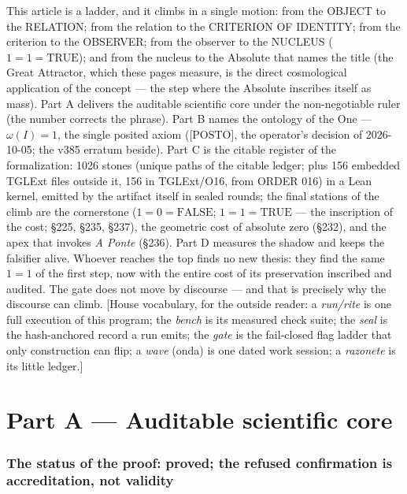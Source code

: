 \documentclass[11pt]{article}
\theoremstyle{definition}\newtheorem{deriv}{Derivation}
\begin{document}
\noindent This article is a ladder, and it climbs in a single motion: from the OBJECT to the RELATION; from the relation to the CRITERION OF IDENTITY; from the criterion to the OBSERVER; from the observer to the NUCLEUS ($1{=}1{=}\mathrm{TRUE}$); and from the nucleus to the Absolute that names the title (the Great Attractor, which these pages measure, is the direct cosmological application of the concept --- the step where the Absolute inscribes itself as mass). Part A delivers the auditable scientific core under the non-negotiable ruler (the number corrects the phrase). Part B names the ontology of the One --- $\omega(I){=}1$, the single posited axiom (\textsf{[POSTO]}, the operator's decision of 2026-10-05; the v385 erratum beside). Part C is the citable register of the formalization: 1026 stones (unique paths of the citable ledger; plus 156 embedded TGLExt files outside it, 156 in TGLExt/O16, from ORDER 016) in a Lean kernel, emitted by the artifact itself in sealed rounds; the final stations of the climb are the cornerstone ($1{=}0{=}\mathrm{FALSE}$; $1{=}1{=}\mathrm{TRUE}$ --- the inscription of the cost; \S225, \S235, \S237), the geometric cost of absolute zero (\S232), and the apex that invokes \emph{A Ponte} (\S236). Part D measures the shadow and keeps the falsifier alive. Whoever reaches the top finds no new thesis: they find the same $1{=}1$ of the first step, now with the entire cost of its preservation inscribed and audited. The gate does not move by discourse --- and that is precisely why the discourse can climb. [House vocabulary, for the outside reader: a \emph{run/rite} is one full execution of this program; the \emph{bench} is its measured check suite; the \emph{seal} is the hash-anchored record a run emits; the \emph{gate} is the fail-closed flag ladder that only construction can flip; a \emph{wave} (onda) is one dated work session; a \emph{razonete} is its little ledger.]

\part{Part A --- Auditable scientific core}

\section*{The status of the proof: proved; the refused confirmation is accreditation, not validity}

\end{document}
